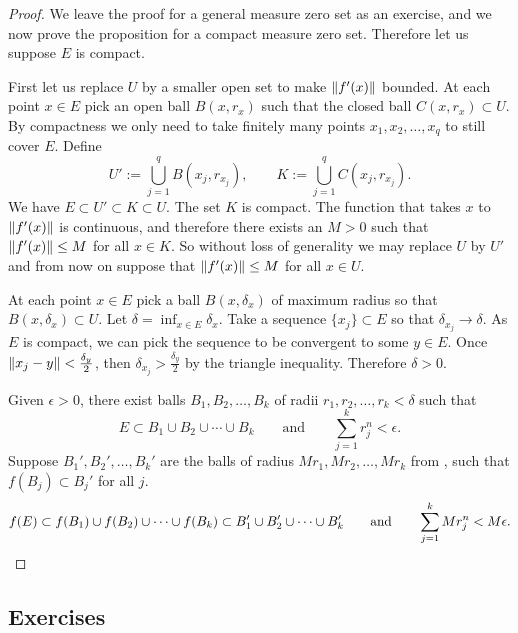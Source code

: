 \begin{proof}
We leave the proof for a general measure zero set as an exercise, and we
now prove the proposition for a compact measure zero set.  Therefore let us 
suppose $E$ is compact.

First let us replace $U$ by a smaller open set to make $\lVert {f'(x)} \rVert$ bounded.
At each point $x \in
E$ pick an open ball $B(x,r_x)$ such that the closed ball $C(x,r_x) \subset
U$.  By compactness we only need to take finitely
many points $x_1,x_2,\ldots,x_q$ to still cover $E$.  Define
\begin{equation*}
U' := \bigcup_{j=1}^q B(x_j,r_{x_j}), \qquad
K := \bigcup_{j=1}^q C(x_j,r_{x_j}).
\end{equation*}
We have $E \subset U' \subset K \subset U$.  The set $K$ is compact.
The function that takes $x$ to $\lVert {f'(x)} \rVert$ is continuous, and therefore
there exists an $M > 0$ such that $\lVert {f'(x)} \rVert \leq M$ for all $x \in K$.
So without loss of generality we may replace $U$ by $U'$ and from now on
suppose that $\lVert {f'(x)} \rVert \leq M$ for all $x \in U$.

At each point $x \in E$ pick a ball $B(x,\delta_x)$ of maximum radius 
so that $B(x,\delta_x) \subset U$.  Let $\delta = \inf_{x\in E} \delta_x$.
Take a sequence $\{ x_j \} \subset E$ so that $\delta_{x_j} \to \delta$.
As $E$ is compact, we can pick the sequence to be convergent to some $y \in
E$.  Once $\lVert {x_j-y} \rVert < \frac{\delta_y}{2}$, then
$\delta_{x_j} > \frac{\delta_y}{2}$ by the triangle inequality.
Therefore $\delta > 0$.

Given $\epsilon > 0$, there exist balls $B_1,B_2,\ldots,B_k$ of radii
$r_1,r_2,\ldots,r_k < \delta$ such that
\begin{equation*}
E \subset B_1 \cup B_2 \cup \cdots \cup B_k
\qquad \text{and} \qquad
\sum_{j=1}^k r_j^n < \epsilon.
\end{equation*}
Suppose $B_1', B_2', \ldots, B_k'$ are the balls of radius
$Mr_1, Mr_2, \ldots, Mr_k$ from
, such that $f(B_j) \subset B_j'$ for all $j$.
\begin{equation*}
f(E) \subset f(B_1) \cup f(B_2) \cup \cdots \cup f(B_k)
\subset B_1' \cup B_2' \cup \cdots \cup B_k'
\qquad \text{and} \qquad
\sum_{j=1}^k Mr_j^n
 < M \epsilon. \qedhere
\end{equation*}
\end{proof}

\subsection{Exercises}

